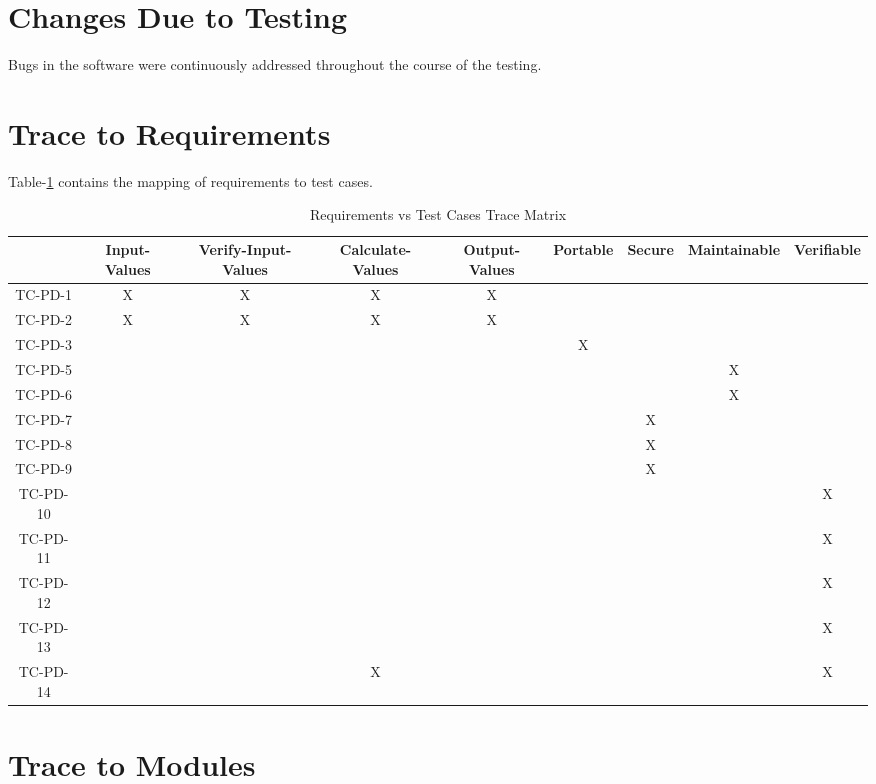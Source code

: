 \documentclass[12pt, titlepage]{article}
\begin{document}
\section{Changes Due to Testing}

Bugs in the \progname{} software were continuously addressed throughout the course of the testing.
		
\section{Trace to Requirements}

Table-\ref{tblTrace} contains the mapping of requirements to test cases.
  
\begin{table}[]
\caption{Requirements vs Test Cases Trace Matrix}
\label{tblTrace}
\begin{adjustbox}{width=1.29\textwidth}
\begin{tabular}{c|c|c|c|c|c|c|c|c|}
 & Input-Values & Verify-Input-Values & Calculate-Values & Output-Values & Portable & Secure & Maintainable & Verifiable \\ \hline
TC-PD-1 & X & X & X  & X  &  &  &  &  \\
TC-PD-2 & X  & X  & X & X &  &  &  &  \\
TC-PD-3  &  &  &  &   & X  &  &  &  \\
TC-PD-5  &  &  &  &  &  &  &X  &  \\
TC-PD-6  &  &  &  &  &  &  &X  &  \\
TC-PD-7  &  &  &  &  &  &X  &  &  \\
TC-PD-8  &  &  &  &  &  &X  &  &  \\
TC-PD-9  &  &  &  &  &  &X  &  &  \\
TC-PD-10 &  &  &  &  &  &  &  &X  \\
TC-PD-11 &  &  &  &  &  &  &  &X \\
TC-PD-12 &  &  &   &   &  &  &  &X  \\
TC-PD-13 &   &  &  &  &  &  &  &X \\
TC-PD-14 &   &  &X  &  &  &  &  &X \\
\end{tabular}
\end{adjustbox}

\end{table}
		
\section{Trace to Modules}		
\end{document}
